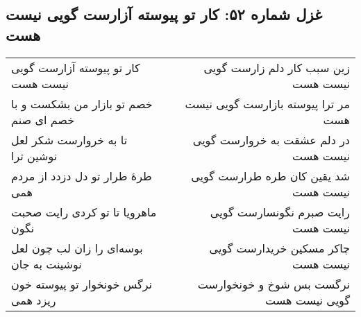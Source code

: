\begin{center}
\section*{غزل شماره ۵۲: کار تو پیوسته آزارست گویی نیست هست}
\label{sec:052}
\begin{longtable}{l p{0.5cm} r}
کار تو پیوسته آزارست گویی نیست هست
&&
زین سبب کار دلم زارست گویی نیست هست
\\
خصم تو بازار من بشکست و با خصم ای صنم
&&
مر ترا پیوسته بازارست گویی نیست هست
\\
تا به خروارست شکر لعل نوشین ترا
&&
در دلم عشقت به خروارست گویی نیست هست
\\
طرهٔ طرار تو دل دزدد از مردم همی
&&
شد یقین کان طره طرارست گویی نیست هست
\\
ماهرویا تا تو کردی رایت صحبت نگون
&&
رایت صبرم نگونسارست گویی نیست هست
\\
بوسه‌ای را زان لب چون لعل نوشینت به جان
&&
چاکر مسکین خریدارست گویی نیست هست
\\
نرگس خونخوار تو پیوسته خون ریزد همی
&&
نرگست بس شوخ و خونخوارست گویی نیست هست
\\
\end{longtable}
\end{center}

